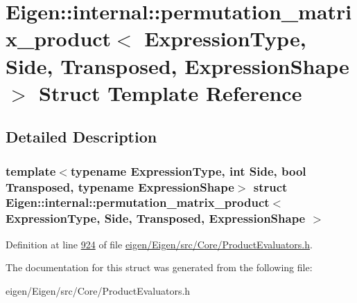 \hypertarget{struct_eigen_1_1internal_1_1permutation__matrix__product}{}\section{Eigen\+:\+:internal\+:\+:permutation\+\_\+matrix\+\_\+product$<$ Expression\+Type, Side, Transposed, Expression\+Shape $>$ Struct Template Reference}
\label{struct_eigen_1_1internal_1_1permutation__matrix__product}


\subsection{Detailed Description}
\subsubsection*{template$<$typename Expression\+Type, int Side, bool Transposed, typename Expression\+Shape$>$\newline
struct Eigen\+::internal\+::permutation\+\_\+matrix\+\_\+product$<$ Expression\+Type, Side, Transposed, Expression\+Shape $>$}



Definition at line \hyperlink{eigen_2_eigen_2src_2_core_2_product_evaluators_8h_source_l00924}{924} of file \hyperlink{eigen_2_eigen_2src_2_core_2_product_evaluators_8h_source}{eigen/\+Eigen/src/\+Core/\+Product\+Evaluators.\+h}.



The documentation for this struct was generated from the following file\+:\begin{DoxyCompactItemize}
\item 
eigen/\+Eigen/src/\+Core/\+Product\+Evaluators.\+h\end{DoxyCompactItemize}
